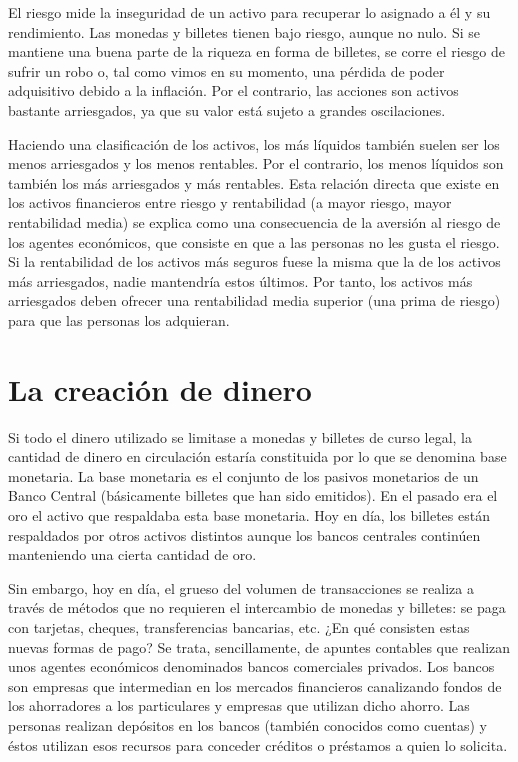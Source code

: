 \documentclass[
]{krantz}
\begin{document}
El riesgo mide la inseguridad de un activo para recuperar lo asignado a él y su rendimiento. Las monedas y billetes tienen bajo riesgo, aunque no nulo. Si se mantiene una buena parte de la riqueza en forma de billetes, se corre el riesgo de sufrir un robo o, tal como vimos en su momento, una pérdida de poder adquisitivo debido a la inflación. Por el contrario, las acciones son activos bastante arriesgados, ya que su valor está sujeto a grandes oscilaciones.

Haciendo una clasificación de los activos, los más líquidos también suelen ser los menos arriesgados y los menos rentables. Por el contrario, los menos líquidos son también los más arriesgados y más rentables. Esta relación directa que existe en los activos financieros entre riesgo y rentabilidad (a mayor riesgo, mayor rentabilidad media) se explica como una consecuencia de la aversión al riesgo de los agentes económicos, que consiste en que a las personas no les gusta el riesgo. Si la rentabilidad de los activos más seguros fuese la misma que la de los activos más arriesgados, nadie mantendría estos últimos. Por tanto, los activos más arriesgados deben ofrecer una rentabilidad media superior (una prima de riesgo) para que las personas los adquieran.

\hypertarget{la-creaciuxf3n-de-dinero}{%
\section{La creación de dinero}\label{la-creaciuxf3n-de-dinero}}

Si todo el dinero utilizado se limitase a monedas y billetes de curso legal, la cantidad de dinero en circulación estaría constituida por lo que se denomina base monetaria. La base monetaria es el conjunto de los pasivos monetarios de un Banco Central (básicamente billetes que han sido emitidos). En el pasado era el oro el activo que respaldaba esta base monetaria. Hoy en día, los billetes están respaldados por otros activos distintos aunque los bancos centrales continúen manteniendo una cierta cantidad de oro.

Sin embargo, hoy en día, el grueso del volumen de transacciones se realiza a través de métodos que no requieren el intercambio de monedas y billetes: se paga con tarjetas, cheques, transferencias bancarias, etc. ¿En qué consisten estas nuevas formas de pago? Se trata, sencillamente, de apuntes contables que realizan unos agentes económicos denominados bancos comerciales privados. Los bancos son empresas que intermedian en los mercados financieros
canalizando fondos de los ahorradores a los particulares y empresas que utilizan dicho ahorro. Las personas realizan depósitos en los bancos (también conocidos como cuentas) y éstos utilizan esos recursos para conceder créditos o préstamos a quien lo solicita.
\end{document}
